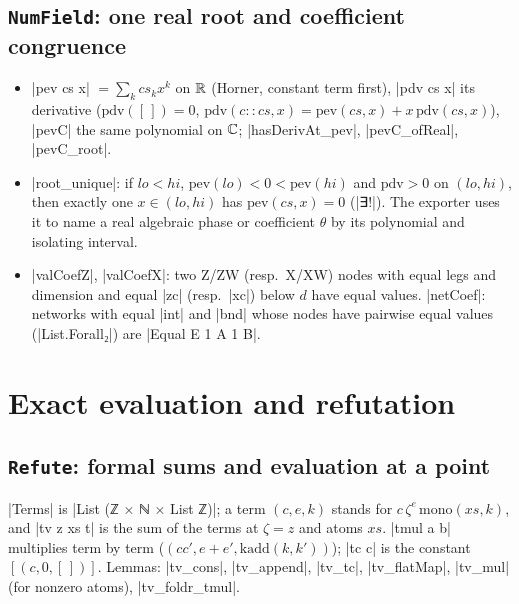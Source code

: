 \subsection{\texttt{NumField}: one real root and coefficient congruence}

\begin{itemize}
\item \lean|pev cs x| $=\sum_kcs_kx^k$ on $\mathbb{R}$ (Horner, constant term first), \lean|pdv cs x| its
  derivative ($\mathrm{pdv}([\,])=0$, $\mathrm{pdv}(c{::}cs,x)=\mathrm{pev}(cs,x)+x\,\mathrm{pdv}(cs,x)$),
  \lean|pevC| the same polynomial on $\mathbb{C}$; \lean|hasDerivAt_pev|, \lean|pevC_ofReal|,
  \lean|pevC_root|.
\item \lean|root_unique|: if $lo<hi$, $\mathrm{pev}(lo)<0<\mathrm{pev}(hi)$ and $\mathrm{pdv}>0$ on
  $(lo,hi)$, then exactly one $x\in(lo,hi)$ has $\mathrm{pev}(cs,x)=0$ (\lean|∃!|). The exporter uses it
  to name a real algebraic phase or coefficient $\theta$ by its polynomial and isolating interval.
\item \lean|valCoefZ|, \lean|valCoefX|: two Z/ZW (resp.\ X/XW) nodes with equal legs and dimension and
  equal \lean|zc| (resp.\ \lean|xc|) below $d$ have equal values. \lean|netCoef|: networks with
  equal \lean|int| and \lean|bnd| whose nodes have pairwise equal values (\lean|List.Forall₂|) are
  \lean|Equal E 1 A 1 B|.
\end{itemize}

\section{Exact evaluation and refutation}\label{sec:lean-core-refute}

\subsection{\texttt{Refute}: formal sums and evaluation at a point}

\begin{definition}
\lean|Terms| is \lean|List (ℤ × ℕ × List ℤ)|; a term $(c,e,k)$ stands for $c\,\zeta^e\,\mathrm{mono}(xs,k)$, and
\lean|tv z xs t| is the sum of the terms at $\zeta=z$ and atoms $xs$. \lean|tmul a b| multiplies term
by term ($(c c',e+e',\mathrm{kadd}(k,k'))$); \lean|tc c| is the constant $[(c,0,[\,])]$. Lemmas:
\lean|tv_cons|, \lean|tv_append|, \lean|tv_tc|, \lean|tv_flatMap|, \lean|tv_mul| (for nonzero
atoms), \lean|tv_foldr_tmul|.
\end{definition}


